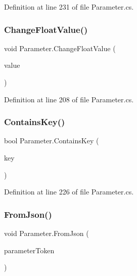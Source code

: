Definition at line 231 of file Parameter.\+cs.

\mbox{\label{class_parameter_a36bcba06d0eb673a26cf3e588707a416}} 
\subsubsection{\texorpdfstring{Change\+Float\+Value()}{ChangeFloatValue()}}
{\footnotesize\ttfamily void Parameter.\+Change\+Float\+Value (\begin{DoxyParamCaption}\item[{float}]{value }\end{DoxyParamCaption})}



Definition at line 208 of file Parameter.\+cs.

\mbox{\label{class_parameter_a9bb3357bb1ea45d97294aaa081cfd999}} 
\subsubsection{\texorpdfstring{Contains\+Key()}{ContainsKey()}}
{\footnotesize\ttfamily bool Parameter.\+Contains\+Key (\begin{DoxyParamCaption}\item[{string}]{key }\end{DoxyParamCaption})}



Definition at line 226 of file Parameter.\+cs.

\mbox{\label{class_parameter_aa0690cb80138cbddf088b0001e99edb5}} 
\subsubsection{\texorpdfstring{From\+Json()}{FromJson()}}
{\footnotesize\ttfamily void Parameter.\+From\+Json (\begin{DoxyParamCaption}\item[{J\+Token}]{parameter\+Token }\end{DoxyParamCaption})}



